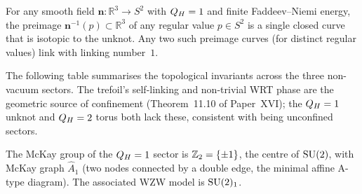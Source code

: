 

\begin{proposition}[Topology of $\QH=1$]
\label{P17:prop:qh1_unknot}
For any smooth field $\mathbf{n}:\mathbb{R}^3\to S^2$ with $\QH=1$
and finite Faddeev--Niemi energy, the preimage
$\mathbf{n}^{-1}(p)\subset\mathbb{R}^3$ of any regular value $p\in S^2$
is a single closed curve that is isotopic to the unknot. Any two such
preimage curves (for distinct regular values) link with linking
number~$1$.
\end{proposition}

\begin{remark}
\label{P17:rem:comparison_table}
The following table summarises the topological invariants across the
three non-vacuum sectors. The trefoil's self-linking and non-trivial
WRT phase are the geometric source of confinement
(Theorem~11.10 %
of Paper~XVI); the $\QH=1$ unknot and $Q_H=2$ torus both lack these,
consistent with being unconfined sectors.
\end{remark}

\begin{proposition}[$\QH=1$ is organised by $\Ztwo\leftrightarrow\widehat{A}_1$]
\label{P17:prop:qh1_Z2}
The McKay group of the $\QH=1$ sector is $\mathbb{Z}_2=\{\pm1\}$, the centre
of $\mathrm{SU}(2)$, with McKay graph $\widehat{A}_1$ (two nodes connected by
a double edge, the minimal affine A-type diagram). The associated
WZW model is $\mathrm{SU}(2)_1$.
\end{proposition}

